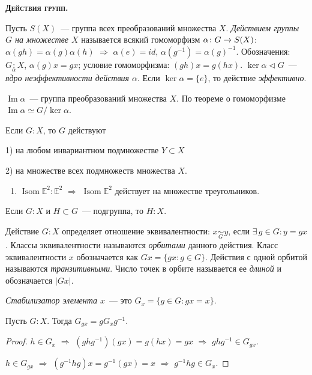 \documentclass[a4paper]{article}
\newcommand*{\tema}[1]{\vspace{20pt}
\begin{center}{\textbf{\textsc{#1.}}}\vspace{5pt}
\end{center}}
\renewcommand{\Isom}{\mathop{\mathrm{Isom}}\nolimits}
\renewcommand{\Im}{\mathop{\mathrm{Im}}\nolimits}
\newcommand*{\p}[1]{#1\nobreak\discretionary{}{\hbox{$\mathsurround=0pt #1$}}{}}
\begin{document}
\tema{Действия групп}

Пусть $S(X)$~--- группа всех преобразований множества $X$.
\emph{Действием группы $G$ на множестве $X$} называется всякий
гомоморфизм $\alpha\colon G\p\to S(X)$:
$\alpha(gh)=\alpha(g)\alpha(h)$ $\Rightarrow$ $\alpha(e)=id$,
$\alpha(g^{-1})=\alpha(g)^{-1}$. Обозначения:
$G\mathop{:}\limits_\alpha X$, $\alpha(g)x=gx$; условие
гомоморфизма: $(gh)x=g(hx)$. $\ker\alpha\triangleleft G$~---
\emph{ядро неэффективности действия $\alpha$}. Если
$\ker\alpha=\{e\}$, то действие \emph{эффективно}.

$\Im\alpha$~--- группа преобразований множества $X$. По теореме о
гомоморфизме $\Im\alpha\simeq G/\ker\alpha$.

Если $G:X$, то $G$ действуют

1) на любом инвариантном подмножестве $Y\subset X$

2) на множестве всех подмножеств множества $X$.

\begin{ex}
\begin{enumerate}
  \item $\Isom\mathbb{E}^2:\mathbb{E}^2$ $\Rightarrow$ $\Isom
  \mathbb{E}^2$ действует на множестве треугольников.
\end{enumerate}
\end{ex}

Если $G:X$ и $H\subset G$~--- подгруппа, то $H:X$.

Действие $G:X$ определяет отношение эквивалентности:
$x\mathop{\sim}\limits_Gy$, если $\exists \, g\in G: y=gx$. Классы
эквивалентности называются \emph{орбитами} данного действия. Класс
эквивалентности $x$ обозначается как $Gx=\{gx:g\in G\}$. Действия с
одной орбитой называются \emph{транзитивными}. Число точек в орбите
называется ее \emph{длиной} и обозначается $|Gx|$.

\emph{Стабилизатор элемента $x$}~--- это $G_x=\{g\in G: gx=x\}$.

\begin{theorem}
Пусть $G:X$. Тогда $G_{gx}=gG_xg^{-1}$.
\end{theorem}

\begin{proof}
$h\in G_x$ $\Rightarrow$ $(ghg^{-1})(gx)=g(hx)=gx$ $\Rightarrow$
$ghg^{-1}\in G_{gx}$.

$h\in G_{gx}$ $\Rightarrow$ $(g^{-1}hg)x=g^{-1}(gx)=x$ $\Rightarrow$
$g^{-1}hg\in G_x$.
\end{proof}
\end{document}
